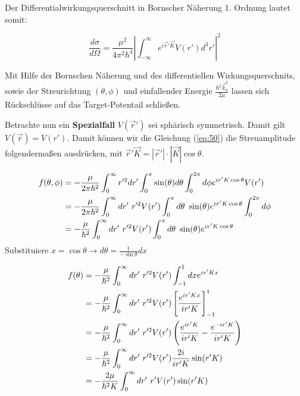 Der Differentialwirkungsquerschnitt in Bornscher Näherung 1. Ordnung lautet somit:

\begin{equation}
  \label{eq:50}
\boxed{  \frac{d\sigma}{d\Omega}=  \frac{\mu^2}{4\pi^2\hbar^4} \left| \int_{-\infty}^\infty e^{i\vec r'\vec K}  V(r')  d^3 r' \right|^2 }
\end{equation}


Mit Hilfe der Bornschen Näherung und des differentiellen Wirkungsquerschnits, sowie der Streurichtung \((\theta,\phi)\) und einfallender Energie \( \frac{\hbar^2\vec k_0^2}{2\mu} \) lassen sich Rückschlüsse auf das Target-Potentail schließen.


Betrachte nun ein \textbf{Spezialfall} \(V(\vec r')\) sei sphärisch symmetrisch. Damit gilt \(V(\vec r) = V(r')\). Damit können wir die Gleichung (\ref{eq:50}) die Streuamplitude folgendermaßen ausdrücken, mit \(\vec r'\vec K = |\vec r'|\cdot|\vec K|\cos\theta\). 

\begin{align}
  \label{eq:51}
   f(\theta,\phi) &=  - \frac{\mu}{2\pi\hbar^2} \int_0^\infty r'^2dr' \int_0^\pi \sin(\theta)d\theta \int_0^{2\pi}d\phi e^{ir'K\cos\theta}  V(r')\notag \\
&= -\frac{\mu}{2\pi\hbar^2} \int_0^\infty dr'\,\, r'^2  V(r') \int_0^\pi d\theta\,\, \sin(\theta)  e^{ir'K\cos\theta} \int_0^{2\pi}d\phi \notag \\
&=- \frac{\mu}{\hbar^2} \int_0^\infty dr'\,\, r'^2  V(r') \int_0^\pi d\theta\,\, \sin(\theta)  e^{ir'K\cos\theta}  
\end{align}
Substituiere \(x=\cos\theta\rightarrow d\theta = \frac{1}{-\sin\theta}  dx \)

\begin{align}
  \label{eq:52}
   f(\theta) &= - \frac{\mu}{\hbar^2} \int_0^\infty dr'\,\, r'^2  V(r') \int^1_{-1} dx  e^{ir'K x} \notag\\
&=- \frac{\mu}{\hbar^2} \int_0^\infty dr'\,\, r'^2  V(r') \left[ \frac{e^{ir'K x} }{ir'K} \right]^1_{-1} \notag \\
&=- \frac{\mu}{\hbar^2} \int_0^\infty dr'\,\, r'^2  V(r') \left( \frac{e^{ir'K} }{ir'K}- \frac{e^{-ir'K} }{ir'K} \right) \notag \\
&=- \frac{\mu}{\hbar^2} \int_0^\infty dr'\,\, r'^2  V(r') \frac{2i}{ir'K} \sin(r'K) \notag \\
&=- \frac{2\mu}{\hbar^2 K} \int_0^\infty dr'\,\, r'  V(r') \sin(r'K) 
\end{align}

